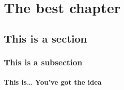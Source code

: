 \documentclass[a4paper,twoside,openright]{memoir}
\begin{document}



\chapter{The best chapter}

\section{This is a section}

\subsection{This is a subsection}

\subsubsection{This is\dots{} You've got the idea}

\lipsum[4-15]



\end{document}

